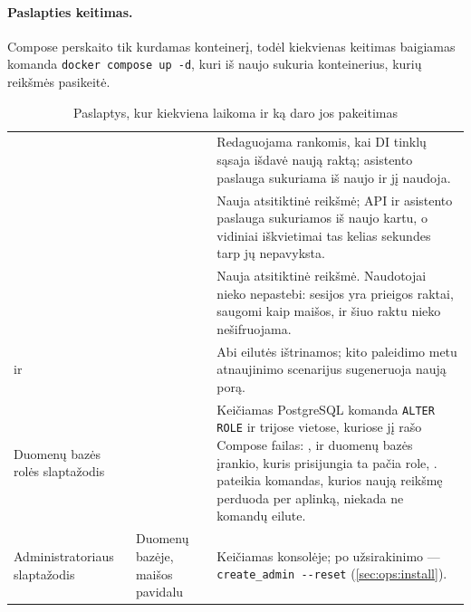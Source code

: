 \paragraph{Paslapties keitimas.} Compose perskaito  tik kurdamas konteinerį, todėl
kiekvienas keitimas baigiamas komanda \texttt{docker compose up -d}, kuri iš naujo sukuria
konteinerius, kurių reikšmės pasikeitė.

\begin{table}[H]
\caption{Paslaptys, kur kiekviena laikoma ir ką daro jos pakeitimas}\label{tab:ops:secrets}
\begin{tabularx}{\textwidth}{@{}L{42mm}L{30mm}Y@{}}
\toprule
{} &  &  \\
\midrule
{} &  & Redaguojama rankomis, kai DI tinklų sąsaja išdavė naują raktą; asistento paslauga sukuriama iš naujo ir jį naudoja. \\
 &  & Nauja atsitiktinė reikšmė; API ir asistento paslauga sukuriamos iš naujo kartu, o vidiniai iškvietimai tas kelias sekundes tarp jų nepavyksta. \\
 &  & Nauja atsitiktinė reikšmė. Naudotojai nieko nepastebi: sesijos yra prieigos raktai, saugomi kaip maišos, ir šiuo raktu nieko nešifruojama. \\
 ir  &  & Abi eilutės ištrinamos; kito paleidimo metu atnaujinimo scenarijus sugeneruoja naują porą. \\
Duomenų bazės rolės slaptažodis &  & Keičiamas PostgreSQL komanda \texttt{ALTER ROLE} ir trijose vietose, kuriose jį rašo Compose failas: ,  ir duomenų bazės įrankio, kuris prisijungia ta pačia role, .  pateikia komandas, kurios naują reikšmę perduoda per aplinką, niekada ne komandų eilute. \\
Administratoriaus slaptažodis & Duomenų bazėje, maišos pavidalu & Keičiamas konsolėje; po užsirakinimo --- \texttt{create\_admin -{}-reset} (\cref{sec:ops:install}). \\
\bottomrule
\end{tabularx}
\end{table}

